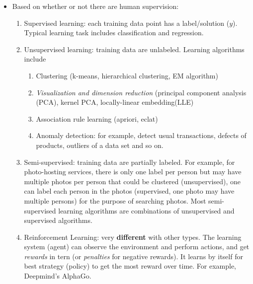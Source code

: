 \documentclass[12pt,oneside,a4paper]{article}
\numberwithin{equation}{section}
\begin{document}
\begin{itemize}
\item Based on whether or not there are human supervision: 
\begin{enumerate}
\item Supervised learning: each training data point has a label/solution ($y$). Typical learning task includes classification and regression. 
\item Unsupervised learning: training data are unlabeled. Learning algorithms include 
\begin{enumerate}
\item Clustering (k-means, hierarchical clustering, EM algorithm)
\item \emph{Visualization and dimension reduction} (principal component analysis (PCA), kernel PCA, locally-linear embedding(LLE)
\item Association rule learning (apriori, eclat)
\item Anomaly detection: for example, detect usual transactions, defects of products, outliers of a data set and so on.  
\end{enumerate}
\item Semi-supervised: training data are partially labeled. For example, for photo-hosting services, there is only one label per person but may have multiple photos per person that could be clustered (unsupervised), one can label each person in the photos (supervised, one photo may have multiple persons) for the purpose of searching photos. Most semi-supervised learning algorithms are combinations of unsupervised and supervised algorithms.
\item Reinforcement Learning: very \textbf{different} with other types. The learning system (agent) can observe the environment and perform actions, and get \emph{rewards} in tern (or \emph{penalties} for negative rewards). It learns by itself for best strategy (policy) to get the most reward over time. For example, Deepmind's AlphaGo.
\end{enumerate}


\end{itemize}
\end{document}
